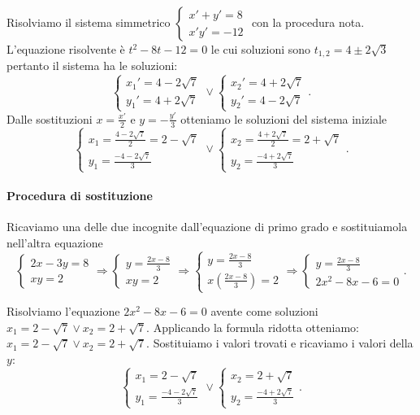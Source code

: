 \begin{exrig}
\begin{esempio}
Risolviamo il sistema simmetrico $\left\{\begin{array}{l}{x'+y'=8}\\{x'y'=-12}\end{array}\right.$ con la procedura nota. L'equazione risolvente è $t^2-8t-12=0$ le cui soluzioni sono $t_{1,2}=4\pm 2\sqrt 3$ pertanto il sistema ha le soluzioni: 
\[\left\{\begin{array}{l}{x_1'=4-2\sqrt 7}\\
{y_1'=4+2\sqrt 7}\end{array}\right.\vee 
\left\{\begin{array}{l}{x_2'=4+2\sqrt 7}\\
{y_2'=4-2\sqrt 7}\end{array}\right..\] 
Dalle sostituzioni $x=\frac{x'} 2$ e $y=-\frac{y'} 3$ otteniamo le soluzioni del sistema iniziale 
\[\left\{\begin{array}{l}{x_1=\frac{4-2\sqrt 7} 2=2-\sqrt 7}\\
{y_1=\frac{-4-2\sqrt 7} 3}\end{array}\right.\vee 
\left\{\begin{array}{l}{x_2=\frac{4+2\sqrt 7} 2=2+\sqrt 7}\\
{y_2=\frac{-4+2\sqrt 7} 3}\end{array}\right..\]
\paragraph{Procedura di sostituzione}
Ricaviamo una delle due incognite dall'equazione di primo grado e sostituiamola nell'altra equazione \[ \left\{\begin{array}{l}{2x-3y=8} \\{{xy}=2}\end{array}\right.\Rightarrow\left\{\begin{array}{l}{y=\frac{2x-8} 3}\\{{xy}=2}\end{array}\right.\Rightarrow \left\{\begin{array}{l}{y=\frac{2x-8} 3}\\{x\left(\frac{2x-8} 3\right)=2}\end{array}\right.\Rightarrow \left\{\begin{array}{l}{y=\frac{2x-8} 3}\\{2x^2-8x-6=0}\end{array}\right.. \]

Risolviamo l'equazione $2x^2-8x-6=0$ avente come soluzioni $x_1=2-\sqrt 7\vee x_2=2+\sqrt 7$. Applicando la formula ridotta otteniamo: $x_1=2-\sqrt 7\vee x_2=2+\sqrt 7$.
Sostituiamo i valori trovati e ricaviamo i valori della $y$: \[ \left\{\begin{array}{l}{x_1=2-\sqrt 7}\\{y_1=\frac{-4-2\sqrt 7} 3}\end{array}\right.\vee \left\{\begin{array}{l}{x_2=2+\sqrt 7}\\{y_2=\frac{-4+2\sqrt 7} 3}\end{array}\right.. \]
\end{esempio}
\end{exrig}
\ovalbox{\risolvi \ref{ese:6.25}}

